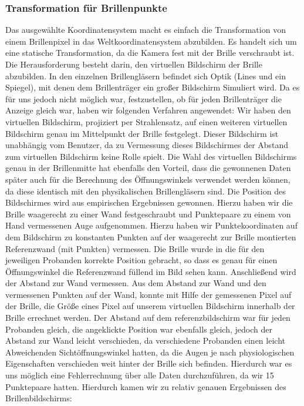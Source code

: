 \subsubsection{Transformation für Brillenpunkte}
Das ausgewählte Koordinatensystem macht es einfach die Transformation von einem Brillenpixel in das Weltkoordinatensystem abzubilden. 
Es handelt sich um eine statische Transformation, da die Kamera fest mit der Brille verschraubt ist. 
Die Herausforderung besteht darin, den virtuellen Bildschirm der Brille abzubilden. In den einzelnen Brillengläsern befindet sich Optik (Lines und ein Spiegel), mit denen dem Brillenträger ein großer Bildschirm Simuliert wird. 
Da es für uns jedoch nicht möglich war, festzustellen, ob für jeden Brillenträger die Anzeige gleich war, haben wir folgenden Verfahren angewendet: 
Wir haben den virtuellen Bildschirm, projiziert per Strahlensatz, auf einen weiteren virtuellen Bildschirm genau im Mittelpunkt der Brille festgelegt. 
Dieser Bildschirm ist unabhängig vom Benutzer, da zu Vermessung dieses Bildschirmes der Abstand zum virtuellen Bildschirm keine Rolle spielt.
Die Wahl des virtuellen Bildschirms genau in der Brillenmitte hat ebenfalls den Vorteil, dass die gewonnenen Daten später auch für die Berechnung des Öffnungswinkels verwendet werden können, da diese identisch mit den physikalischen Brillengläsern sind.
Die Position des Bildschirmes wird aus empirischen Ergebnissen gewonnen. 
Hierzu haben wir die Brille waagerecht zu einer Wand festgeschraubt und Punktepaare zu einem von Hand vermessenen Auge aufgenommen. 
Hierzu haben wir Punktekoordinaten auf dem Bildschirm zu konstanten Punkten auf der waagerecht zur Brille montierten Referenzwand (mit Punkten) vermessen. 
Die Brille wurde in die für den jeweiligen Probanden korrekte Position gebracht, so dass es genau für einen Öffnungswinkel die Referenzwand füllend im Bild sehen kann. 
Anschließend wird der Abstand zur Wand vermessen. 
Aus dem Abstand zur Wand und den vermessenen Punkten auf der Wand, konnte mit Hilfe der gemessenen Pixel auf der Brille, die Größe eines Pixel auf unserem virtuellen Bildschirm innerhalb der Brille errechnet werden. 
Der Abstand auf dem referenzbildschirm war für jeden Probanden gleich, die angeklickte Position war ebenfalls gleich, jedoch der Abstand zur Wand leicht verschieden, da verschiedene Probanden einen leicht Abweichenden Sichtöffnungswinkel hatten, da die Augen je nach physiologischen Eigenschaften verschieden weit hinter der Brille sich befinden. 
Hierdurch war es uns möglich eine Fehlerrechnung über alle Daten durchzuführen, da wir 15 Punktepaare hatten. 
Hierdurch kamen wir zu relativ genauen Ergebnissen des Brillenbildschirms:

